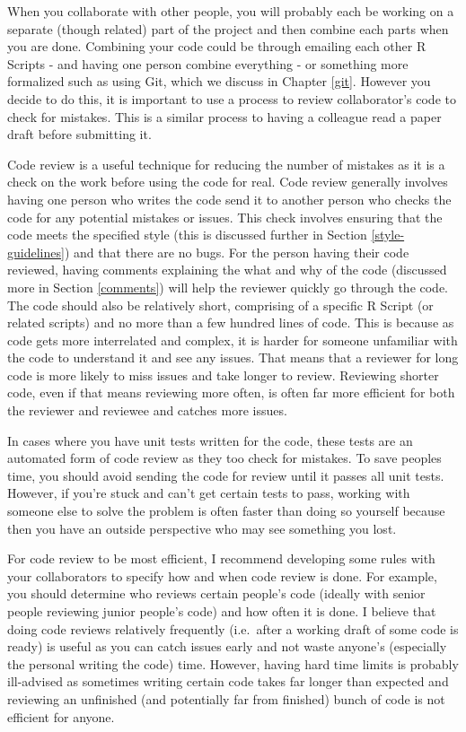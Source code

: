 \documentclass[
]{krantz}
\begin{document}
When you collaborate with other people, you will probably each be working on a separate (though related) part of the project and then combine each parts when you are done. Combining your code could be through emailing each other R Scripts - and having one person combine everything - or something more formalized such as using Git, which we discuss in Chapter \ref{git}. However you decide to do this, it is important to use a process to review collaborator's code to check for mistakes. This is a similar process to having a colleague read a paper draft before submitting it.

Code review is a useful technique for reducing the number of mistakes as it is a check on the work before using the code for real. Code review generally involves having one person who writes the code send it to another person who checks the code for any potential mistakes or issues. This check involves ensuring that the code meets the specified style (this is discussed further in Section \ref{style-guidelines}) and that there are no bugs. For the person having their code reviewed, having comments explaining the what and why of the code (discussed more in Section \ref{comments}) will help the reviewer quickly go through the code. The code should also be relatively short, comprising of a specific R Script (or related scripts) and no more than a few hundred lines of code. This is because as code gets more interrelated and complex, it is harder for someone unfamiliar with the code to understand it and see any issues. That means that a reviewer for long code is more likely to miss issues and take longer to review. Reviewing shorter code, even if that means reviewing more often, is often far more efficient for both the reviewer and reviewee and catches more issues.

In cases where you have unit tests written for the code, these tests are an automated form of code review as they too check for mistakes. To save peoples time, you should avoid sending the code for review until it passes all unit tests. However, if you're stuck and can't get certain tests to pass, working with someone else to solve the problem is often faster than doing so yourself because then you have an outside perspective who may see something you lost.

For code review to be most efficient, I recommend developing some rules with your collaborators to specify how and when code review is done. For example, you should determine who reviews certain people's code (ideally with senior people reviewing junior people's code) and how often it is done. I believe that doing code reviews relatively frequently (i.e.~after a working draft of some code is ready) is useful as you can catch issues early and not waste anyone's (especially the personal writing the code) time. However, having hard time limits is probably ill-advised as sometimes writing certain code takes far longer than expected and reviewing an unfinished (and potentially far from finished) bunch of code is not efficient for anyone.
\end{document}
